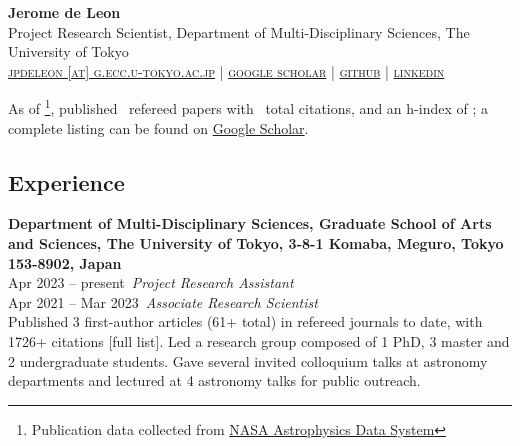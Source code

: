 \documentclass[11pt,letterpaper]{article}
\begin{document}
\thispagestyle{empty}\sloppy\sloppypar\raggedbottom

\textbf{\Large Jerome de Leon} \\[0.5ex]
Project Research Scientist, Department of Multi-Disciplinary Sciences, The University of Tokyo \\
\textsc{\small 
    \href{mailto:jpdeleon@g.ecc.u-tokyo.ac.jp}{jpdeleon [at] g.ecc.u-tokyo.ac.jp} | %
    \href{https://scholar.google.com/citations?hl=en&user=_Z8ialwAAAAJ&view_op=list_works&sortby=pubdate}{google scholar} | %
    \href{https://github.com/jpdeleon}{github} | %
    \href{https://www.linkedin.com/in/jpdeleonbsap/}{linkedin} %
}\\[0.5ex]


\vspace{1ex}
\begin{list}{}{\cvlist}
    \item As of \pubsdate\footnote{Publication data collected from \href{https://ui.adsabs.harvard.edu/}{NASA Astrophysics Data System}}, published \pubsnumber\ refereed papers with \pubscitations\ total citations, and an h-index of \pubshindex; a complete listing can be found on \href{https://scholar.google.co.jp/citations?hl=en&user=_Z8ialwAAAAJ}{Google Scholar}.
\end{list}

\subsection{Experience}

\begin{list}{}{\cvlist}
    \item
        \textbf{Department of Multi-Disciplinary Sciences, Graduate School of Arts and Sciences, The University of Tokyo, 3-8-1 Komaba, Meguro, Tokyo 153-8902, Japan} \\
        {\color{numcolor} Apr 2023 -- present}\,
        \emph{Project Research Assistant} \\
        {\color{numcolor} Apr 2021 -- Mar 2023}\,
        \emph{Associate Research Scientist} \\
        Published 3 first-author articles (61+ total) in refereed journals to date, with 1726+ citations [full list]. Led a research group composed of 1 PhD, 3 master and 2 undergraduate students. Gave several invited colloquium talks at astronomy departments and lectured at 4 astronomy talks for public outreach.
        \\[1.5ex]
\end{list}
\end{document}
